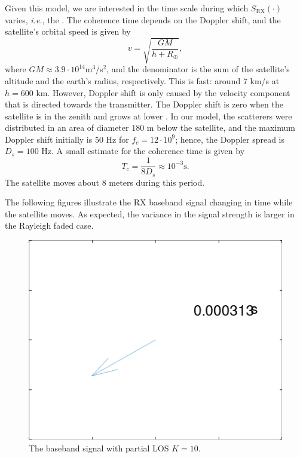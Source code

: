 \documentclass{article}
\begin{document}
Given this model, we are interested in the time scale during which $S_{\text{RX}}(\cdot)$ varies, \textit{i.e.}, the . The coherence time depends on the Doppler shift, and the satellite's orbital speed is given by
\begin{equation}
  v = \sqrt{\frac{GM}{h + R_{\oplus}}}, \tag{3}
\end{equation}
where $GM \approx 3.9 \cdot 10^{14}$m$^3/$s$^2$, and the denominator is the sum of the satellite's altitude and the earth's radius, respectively. This is fast: around $7$ km/s at $h=600$ km. However, Doppler shift is only caused by the velocity component that is directed towards the transmitter. The Doppler shift is zero when the satellite is in the zenith and grows at lower . In our model, the scatterers were distributed in an area of diameter $180$ m below the satellite, and the maximum Doppler shift initially is $50$ Hz for $f_c = 12 \cdot 10^{9}$; hence, the Doppler spread is $D_s = 100$ Hz. A small estimate for the coherence time is given by
\begin{equation}
T_c = \frac{1}{8 D_s} \approx  10^{-3} \text{s}. \tag{4}
\end{equation}
The satellite moves about $8$ meters during this period.

The following figures illustrate the RX baseband signal changing in time while the satellite moves. As expected, the variance in the signal strength is larger in the Rayleigh faded case.

\begin{figure}
  \includegraphics[width=\linewidth]{basebandgifK10.gif}
  \caption{The baseband signal with partial LOS $K=10$.}
\end{figure}
\end{document}
